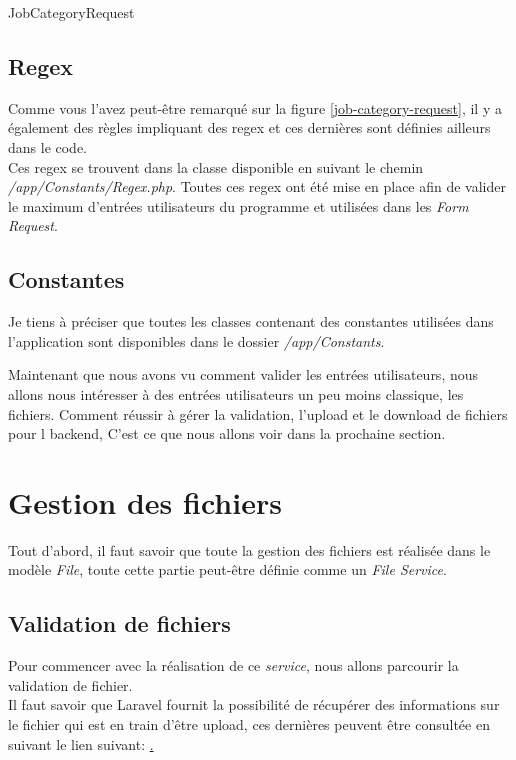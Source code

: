 \documentclass[
    iai, %
    il, %
]{heig-tb}
\begin{document}
\begin{listing}[h]
    \inputminted{php}{assets/code/JobCategoryRequest.php}
    \caption{JobCategoryRequest \label{job-category-request}}
\end{listing}

\subsection{Regex}
Comme vous l'avez peut-être remarqué sur la figure \ref{job-category-request}, il y a également des règles impliquant des \Gls{regex} et ces dernières sont définies ailleurs dans le code. \\
Ces \Gls{regex} se trouvent dans la classe disponible en suivant le chemin \emph{/app/Constants/Regex.php}. Toutes ces \Gls{regex} ont été mise en place afin de valider le maximum d'entrées utilisateurs du programme et utilisées dans les \emph{Form Request}.

\subsection{Constantes}
Je tiens à préciser que toutes les classes contenant des constantes utilisées dans l'application sont disponibles dans le dossier \emph{/app/Constants}.

Maintenant que nous avons vu comment valider les entrées utilisateurs, nous allons nous intéresser à des entrées utilisateurs un peu moins classique, les fichiers. Comment réussir à gérer la validation, l'upload et le download de fichiers pour l \Gls{backend}, C'est ce que nous allons voir dans la prochaine section.

\section{Gestion des fichiers}
Tout d'abord, il faut savoir que toute la gestion des fichiers est réalisée dans le modèle \emph{File}, toute cette partie peut-être définie comme un \emph{File Service}.

\subsection{Validation de fichiers}

Pour commencer avec la réalisation de ce \emph{service}, nous allons parcourir la validation de fichier. \\
Il faut savoir que Laravel fournit la possibilité de récupérer des informations sur le fichier qui est en train d'être upload, ces dernières peuvent être consultée en suivant le lien suivant: \href{https://laravel.com/docs/9.x/filesystem#other-uploaded-file-information}. \\
\end{document}
